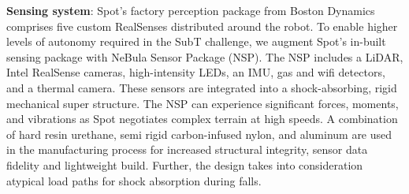 \documentclass[letterpaper, 10pt, conference]{ieeeconf}      %
\newcommand{\ph}[1]{{\textbf{#1}:}} %
\newcommand{\rev}[1]{{\color{blue}#1}} %
\begin{document}


\ph{Sensing system} 
Spot's factory perception package from Boston Dynamics comprises five custom RealSenses distributed around the robot. 
To enable higher levels of autonomy required in the SubT challenge, we augment Spot's in-built sensing package with NeBula Sensor Package (NSP). %
The NSP includes a LiDAR, Intel RealSense cameras, high-intensity LEDs, an IMU, gas and wifi detectors, and a thermal camera.
These sensors are integrated into a shock-absorbing, rigid mechanical super structure. 
The NSP can experience significant forces, moments, and vibrations as Spot negotiates complex terrain at high speeds.
A combination of hard resin urethane, semi rigid carbon-infused nylon, and aluminum are used in the manufacturing process for increased structural integrity, sensor data fidelity and lightweight build. 
Further, the design takes into consideration atypical load paths for shock absorption during falls. %
\end{document}
